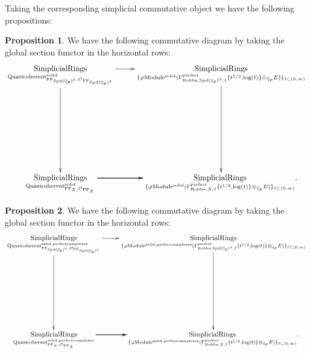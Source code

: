\documentclass[12pt]{book}
\theoremstyle{definition}
\newtheorem{proposition}{Proposition}
\begin{document}
\indent Taking the corresponding simplicial commutative object we have the following propositions:

\begin{proposition}
We have the following commutative diagram by taking the global section functor in the horizontal rows:
\[\displayindent=+0in
\xymatrix@R+7pc{
\underset{\mathrm{Quasicoherent}^{\mathrm{solid}}_{\mathrm{FF}_{\mathrm{Spd}(\mathbb{Q}_p)^\diamond},\mathcal{O}_{\mathrm{FF}_{\mathrm{Spd}(\mathbb{Q}_p)^\diamond}}}}{\mathrm{SimplicialRings}} \ar[d] \ar[r] &\underset{\{\varphi\mathrm{Module}^{\mathrm{solid}}(\Gamma^\text{perfect}_{\text{Robba},{\mathrm{Spd}(\mathbb{Q}_p)^\diamond},I}\{t^{1/2},\log(t)\}\otimes_{\mathbb{Q}_p}E)\}_{I\subset (0,\infty)}}{\mathrm{SimplicialRings}} \ar[d]\\
\underset{\mathrm{Quasicoherent}^{\mathrm{solid}}_{\mathrm{FF}_X,\mathcal{O}_{\mathrm{FF}_X}}}{\mathrm{SimplicialRings}}  \ar[r] \ar[r] \ar[r] &\underset{\{\varphi\mathrm{Module}^{\mathrm{solid}}(\Gamma^\text{perfect}_{\text{Robba},X,I}\{t^{1/2},\log(t)\}\otimes_{\mathbb{Q}_p}E)\}_{I\subset (0,\infty)}}{\mathrm{SimplicialRings}}.
}
\]
\end{proposition}

\begin{proposition}
We have the following commutative diagram by taking the global section functor in the horizontal rows:
\[\displayindent=+0in
\xymatrix@C+0in@R+7pc{
\underset{\mathrm{Quasicoherent}^{\mathrm{solid,perfectcomplexes}}_{\mathrm{FF}_{\mathrm{Spd}(\mathbb{Q}_p)^\diamond},\mathcal{O}_{\mathrm{FF}_{\mathrm{Spd}(\mathbb{Q}_p)^\diamond}}}}{\mathrm{SimplicialRings}}\ar[d] \ar[r] &\underset{\{\varphi\mathrm{Module}^{\mathrm{solid,perfectcomplexes}}(\Gamma^\text{perfect}_{\text{Robba},{\mathrm{Spd}(\mathbb{Q}_p)^\diamond},I}\{t^{1/2},\log(t)\}\otimes_{\mathbb{Q}_p}E)\}_{I\subset (0,\infty)}}{\mathrm{SimplicialRings}}\ar[d]\\
\underset{\mathrm{Quasicoherent}^{\mathrm{solid,perfectcomplexes}}_{\mathrm{FF}_X,\mathcal{O}_{\mathrm{FF}_X}}}{\mathrm{SimplicialRings}}  \ar[r] \ar[r] \ar[r] &\underset{\{\varphi\mathrm{Module}^{\mathrm{solid,perfectcomplexes}}(\Gamma^\text{perfect}_{\text{Robba},X,I}\{t^{1/2},\log(t)\}\otimes_{\mathbb{Q}_p}E)\}_{I\subset (0,\infty)}}{\mathrm{SimplicialRings}}.  
}
\]
\end{proposition}
\end{document}
